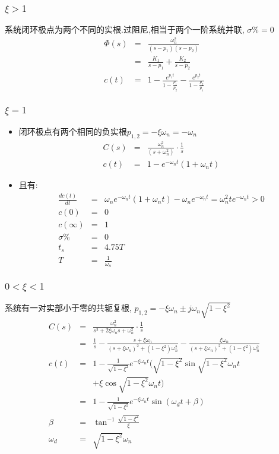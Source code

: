 \documentclass{beamer}
\begin{document}
\begin{frame}
\frametitle{$\xi>1$}
\label{sec-2-3}

   系统闭环极点为两个不同的实根.过阻尼,相当于两个一阶系统并联, $\sigma\%=0$
      \begin{eqnarray*}
      \Phi(s) & = & \frac{\omega_n^2}{(s-p_1)(s-p_2)} \\
              & = & \frac{K_1}{s-p_1}+\frac{K_2}{s-p_2}\\
      c(t)    &=& 1-\frac{e^{p_1 t}}{1-\frac{p_1}{p_2}}-\frac{e^{p_2 t}}{1-\frac{p_2}{p_1}}
      \end{eqnarray*}
\end{frame}
\begin{frame}
\frametitle{$\xi=1$}
\label{sec-2-4}

\begin{itemize}
\item <1-> 闭环极点有两个相同的负实根$p_{1,2}=-\xi\omega_n=-\omega_n$
      \begin{eqnarray*}
      C(s) & = &\frac{\omega_n^2}{(s+\omega_n^2)}\cdot\frac{1}{s} \\
      c(t) &=& 1-e^{-\omega_n t}(1+\omega_n t)
      \end{eqnarray*}
\item <2-> 且有:
      \begin{eqnarray*}
      \frac{dc(t)}{dt} &=& \omega_ne^{-\omega_n t}(1+\omega_n t)-\omega_n e^{-\omega_n t}
       =  \omega_n^2 te^{-\omega_n t} 
       >  0 \\
      c(0) &=&0 \\
      c(\infty)&=&1\\
      \sigma \% &=& 0\\
      t_s &=& 4.75T \\
      T &=&\frac{1}{\omega_n}
      \end{eqnarray*}
\end{itemize}
\end{frame}
\begin{frame}
\frametitle{$0<\xi<1$}
\label{sec-2-5}

   系统有一对实部小于零的共轭复根, $p_{1,2}  =  -\xi\omega_n\pm j\omega_n\sqrt{1-\xi^2}$
\begin{eqnarray*}
C(s) &=& \frac{\omega_n^2}{s^2+2\xi\omega_n s+\omega_n^2}\cdot\frac{1}{s} \\
     &=& \frac{1}{s}-\frac{s+\xi\omega_n}{(s+\xi\omega_n)^2+(1-\xi^2)\omega_n^2}-\frac{\xi\omega_n}{(s+\xi\omega_n)^2+(1-\xi^2)\omega_n^2} \\
c(t) &=& 1-\frac{1}{\sqrt{1-\xi^2}}e^{-\xi\omega_n t}(\sqrt{1-\xi^2}\sin\sqrt{1-\xi^2}\omega_n t \\
     & &+\xi\cos\sqrt{1-\xi^2}\omega_n t)\\
     &=& 1-\frac{1}{\sqrt{1-\xi^2}}e^{-\xi\omega_n t}\sin(\omega_d t+\beta)\\
\beta & = & \tan^{-1}\frac{\sqrt{1-\xi^2}}{\xi} \\
\omega_d &=& \sqrt{1-\xi^2}\omega_n
\end{eqnarray*}
\end{frame}
\end{document}
